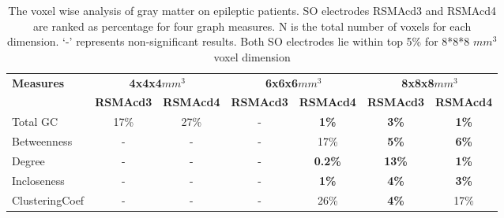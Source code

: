 \begin{table}[]
\renewcommand{\arraystretch}{1.2} %
\setlength{\tabcolsep}{2pt} %
\centering
\begin{tabular}{|l|c|c|c|c|c|c|}
\hline
\multirow{2}{*}{\textbf{Measures}} & \multicolumn{2}{c|}{\textbf{4x4x4$mm^3$}}                                     & \multicolumn{2}{c|}{\textbf{6x6x6$mm^3$}}                                     & \multicolumn{2}{c|}{\textbf{8x8x8$mm^3$}}                                     \\ \cline{2-7}
                                   & \multicolumn{1}{l|}{\textbf{RSMAcd3}} & \multicolumn{1}{l|}{\textbf{RSMAcd4}} & \multicolumn{1}{l|}{\textbf{RSMAcd3}} & \multicolumn{1}{l|}{\textbf{RSMAcd4}} & \multicolumn{1}{l|}{\textbf{RSMAcd3}} & \multicolumn{1}{l|}{\textbf{RSMAcd4}} \\ \hline
Total GC                           & 17\%                                  & 27\%                                  & -                                     & \textbf{1\%}                          & \textbf{3\%}                          & \textbf{1\%}                          \\ \hline
Betweenness                        & -                                     & -                                     & -                                  & 17\%                                  & \textbf{5\%}                          & \textbf{6\%}                          \\ \hline
Degree                             & -                                     & -                                     & -                                     & \textbf{0.2\%}                        & \textbf{13\%}                         & \textbf{1\%}                          \\ \hline
Incloseness                        & -                                     & -                                     & -                                     & \textbf{1\%}                          & \textbf{4\%}                          & \textbf{3\%}                          \\ \hline
ClusteringCoef                    & -                                     & -                                     & -                                     & 26\%                                  & \textbf{4\%}                          & 17\%                                  \\ \hline
\end{tabular}
	\caption{The voxel wise analysis of gray matter on epileptic patients. SO electrodes RSMAcd3 and RSMAcd4 are ranked as percentage for four graph measures. N is the total number of voxels for each dimension. `-' represents non-significant results. Both SO electrodes lie within top 5\% for 8*8*8 $mm^3$ voxel dimension}
	\label{table:voxelwise_summary}
\end{table}

